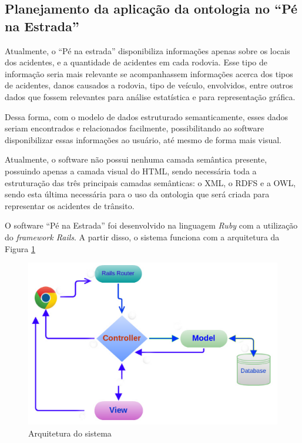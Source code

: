 \subsection{Planejamento da aplicação da ontologia no ``Pé na Estrada''}

Atualmente, o “Pé na estrada” disponibiliza informações apenas sobre os locais dos
acidentes, e a quantidade de acidentes em cada rodovia. Esse tipo de informação seria mais
relevante se acompanhassem informações acerca dos tipos de acidentes, danos causados a
rodovia, tipo de veículo, envolvidos, entre outros dados que fossem relevantes para análise
estatística e para representação gráfica.

Dessa forma, com o modelo de dados estruturado semanticamente, esses dados seriam
encontrados e relacionados facilmente, possibilitando ao software disponibilizar essas
informações ao usuário, até mesmo de forma mais visual.

Atualmente, o software não possui nenhuma camada semântica presente, possuindo
apenas a camada visual do HTML, sendo necessária toda a estruturação das três principais
camadas semânticas: o XML, o RDFS e a OWL, sendo esta última necessária para o uso da
ontologia que será criada para representar os acidentes de trânsito.

O software ``Pé na Estrada'' foi desenvolvido na linguagem \textit{Ruby} com a utilização do \textit{framework Rails}. 
A partir disso, o sistema funciona com a arquitetura da Figura \ref{fig:arquitetura}

\begin{figure}[!htb]
 \centering
 \includegraphics[scale = 0.7]{figuras/arquiteturarails.png}
 \caption{Arquitetura do sistema}
 \label{fig:arquitetura}

\end{figure}